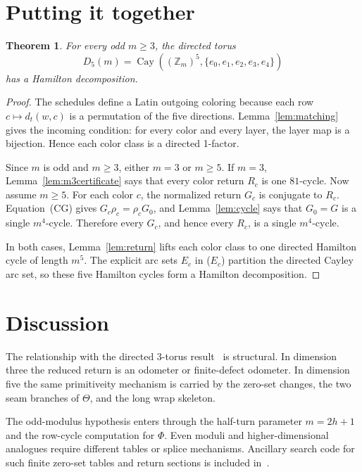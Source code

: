 \documentclass[11pt]{article}
\newtheorem{theorem}{Theorem}
\theoremstyle{definition}
\begin{document}
\section{Putting it together}\label{sec:putting}

\begin{theorem}\label{thm:main}
For every odd \(m\ge3\), the directed torus
\[
D_5(m)=\operatorname{Cay}((\mathbb Z_m)^5,\{e_0,e_1,e_2,e_3,e_4\})
\]
has a Hamilton decomposition.
\end{theorem}

\begin{proof}
The schedules define a Latin outgoing coloring because each row \(c\mapsto d_t(w,c)\) is a permutation
of the five directions.  Lemma~\ref{lem:matching} gives the incoming condition: for every color and
every layer, the layer map is a bijection.  Hence each color class is a directed 1-factor.

Since \(m\) is odd and \(m\ge3\), either \(m=3\) or \(m\ge5\).  If \(m=3\),
Lemma~\ref{lem:m3certificate} says that every color return \(R_c\) is one \(81\)-cycle.  Now assume
\(m\ge5\).  For each color \(c\),
the normalized return \(G_c\) is conjugate to \(R_c\).  Equation~\textup{(\(\mathrm{CG}\))} gives
\(G_c\rho_c=\rho_cG_0\), and Lemma~\ref{lem:cycle} says that \(G_0=G\) is a single \(m^4\)-cycle.
Therefore every \(G_c\), and hence every \(R_c\), is a single \(m^4\)-cycle.

In both cases, Lemma~\ref{lem:return} lifts each color class to one directed Hamilton cycle of length
\(m^5\).  The explicit arc sets \(E_c\) in \textup{(\(E_c\))} partition the directed Cayley arc set, so
these five Hamilton cycles form a Hamilton decomposition.
\end{proof}


\section{Discussion}\label{sec:discussion}

The relationship with the directed \(3\)-torus result~\cite{d3torus} is structural.  In dimension
three the reduced return is an odometer or finite-defect odometer.  In dimension five the same
primitiveity mechanism is carried by the zero-set changes, the two seam branches of \(\Theta\), and
the long wrap skeleton.

The odd-modulus hypothesis enters through the half-turn parameter \(m=2h+1\) and the row-cycle
computation for \(\Phi\).  Even moduli and higher-dimensional analogues require different tables or
splice mechanisms.  Ancillary search code for such finite zero-set tables and return sections is
included in~\cite{D5OddLean}.
\end{document}
